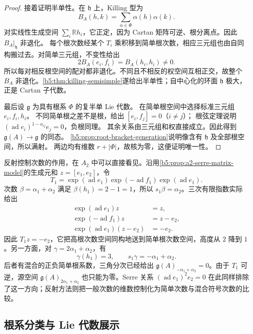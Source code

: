 \begin{proof}
	接着证明半单性。在 \(\mathfrak h\) 上，Killing 型为
	\[
		B_A(h,k)=\sum_{\alpha\in\Phi}\alpha(h)\alpha(k).
	\]
	对实线性生成空间 \(\sum_i\mathbb Rh_i\)，它正定，因为 Cartan 矩阵可逆、根分离点。因此 \(B_A|_{\mathfrak h}\) 非退化。 每个根次数经某个 \(T_i\) 乘积移到简单根次数，相应三元组也由自同构搬过去。对简单三元组，不变性给出
	\[
		2B_A(e_i,f_i)=B_A(h_i,h_i)\ne0.
	\]
	所以每对相反根空间的配对都非退化。不同且不相反的权空间互相正交，故整个 \(B_A\) 非退化。\cref{b5:thm:killing-semisimple}遂给出半单性；自中心化的环面 \(\mathfrak h\) 极大，正是 Cartan 子代数。

	最后设 \(\mathfrak g\) 为具有根系 \(\Phi\) 的复半单 Lie 代数。 在简单根空间中选择标准三元组 \(e_i,f_i,h_i\)。 不同简单根之差不是根，给出 \([e_i,f_j]=0\)（\(i\ne j\)）； 根弦定理说明 \((\operatorname{ad}e_i)^{1-a_{ij}}e_j=0\)，负根同理。 其余关系由三元组和权直接成立。因此得到 \(\mathfrak g(A)\to\mathfrak g\) 的同态。 \cref{b5:prop:root-bracket-generation}说明像含有 \(\mathfrak h\) 及全部根空间，所以满射。 两边均有维数 \(r+|\Phi|\)，故核为零，这便证明唯一性。
\end{proof}

反射控制次数的作用，在 \(A_2\) 中可以直接看见。沿用\cref{b5:prop:a2-serre-matrix-model}的生成元和 \(z=[e_1,e_2]\)，令
\[
	T_1=\exp(\operatorname{ad}e_1) \exp(-\operatorname{ad}f_1) \exp(\operatorname{ad}e_1).
\]
次数 \(\beta=\alpha_1+\alpha_2\) 满足 \(\beta(h_1)=2-1=1\)，所以 \(s_1\beta=\alpha_2\)。三次有限指数实际给出
\[
	\begin{aligned}
		\exp(\operatorname{ad}e_1)z&=z,\\
		\exp(-\operatorname{ad}f_1)z&=z-e_2,\\
		\exp(\operatorname{ad}e_1)(z-e_2)&=-e_2.
	\end{aligned}
\]
因此 \(T_1z=-e_2\)，它把高根次数空间同构地送到简单根次数空间，高度从 \(2\) 降到 \(1\)。另一方面，对 \(\gamma=2\alpha_1+\alpha_2\)，有
\[
	\gamma(h_1)=3,\qquad s_1\gamma=-\alpha_1+\alpha_2.
\]
后者有混合的正负简单根系数，三角分次已经给出 \(\mathfrak g(A)_{-\alpha_1+\alpha_2}=0\)。由于 \(T_1\) 可逆，源空间 \(\mathfrak g(A)_{2\alpha_1+\alpha_2}\) 也只能为零。Serre 关系 \((\operatorname{ad}e_1)^2e_2=0\) 在此同样排除了这一方向；反射方法则把一般次数的维数控制化为简单次数与混合符号次数的比较。

\subsection{根系分类与 Lie 代数展示}
\label{b5:subsec:1704:03}

